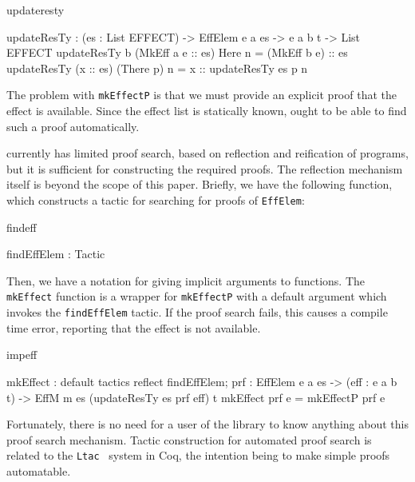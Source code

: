\begin{SaveVerbatim}{updateresty}

updateResTy : (es : List EFFECT) -> 
              EffElem e a es -> e a b t -> List EFFECT
updateResTy {b} (MkEff a e :: es) Here n 
    = (MkEff b e) :: es
updateResTy (x :: es) (There p) n 
    = x :: updateResTy es p n

\end{SaveVerbatim}

\noindent
The problem with \texttt{mkEffectP} is that we must provide an 
explicit proof that the effect is available. Since the effect list is statically
known, \Idris{} ought to be able to find such a proof automatically.

\Idris{} currently has limited proof search, based on
reflection and reification of programs, but it
is sufficient for constructing the required proofs. The reflection mechanism
itself is beyond the scope of this paper. Briefly, we have
the following function, which constructs a tactic for searching for proofs 
of \texttt{EffElem}:

\begin{SaveVerbatim}{findeff}

findEffElem : Tactic 

\end{SaveVerbatim}

\noindent
Then, we have a notation for giving  implicit arguments to
functions. The \texttt{mkEffect} function is a wrapper for \texttt{mkEffectP}
with a default argument which invokes the \texttt{findEffElem} tactic. If
the proof search fails, this causes a compile time error, reporting that the
effect is not available.

\label{sect:mkeffect}
\begin{SaveVerbatim}{impeff}

mkEffect : {default tactics { reflect findEffElem; } 
              prf : EffElem e a es} -> 
           (eff : e a b t) -> 
           EffM m es (updateResTy es prf eff) t
mkEffect {prf} e = mkEffectP prf e

\end{SaveVerbatim}

\noindent
Fortunately, there is no need for a user of the library to know anything about
this proof search mechanism. Tactic construction for automated proof search is
related to the \texttt{Ltac}~\cite{Delahaye2000} system in Coq, the intention
being to make simple proofs automatable.

